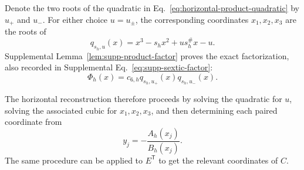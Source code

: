\documentclass[aps,prx,reprint,nofootinbib,twoside,superscriptaddress,longbibliography,floatfix]{revtex4-2}
\theoremstyle{definition}
\begin{document}
Denote the two roots of the quadratic in Eq.~\ref{eq:horizontal-product-quadratic} by $u_+$ and $u_-$. For either choice $u=u_\pm$, the corresponding coordinates $x_1,x_2,x_3$ are the roots of
\begin{equation}
q_{s_h,u}(x)=x^3-s_hx^2+us_h^\#x-u.
\label{eq:horizontal-coordinate-cubic}
\end{equation}
Supplemental Lemma~\ref{lem:supp-product-factor} proves the exact factorization,
also recorded in Supplemental Eq.~\eqref{eq:supp-sextic-factor}:
\begin{equation}
\Phi_h(x)=c_{6,h}q_{s_h,u_+}(x)q_{s_h,u_-}(x).
\end{equation}

The horizontal reconstruction therefore proceeds by solving the quadratic for $u$, solving the associated cubic for $x_1,x_2,x_3$, and then determining each paired coordinate from
\begin{equation}
y_j=-\frac{A_h(x_j)}{B_h(x_j)}.
\end{equation}
The same procedure can be applied to $E^{\mathsf T}$ to get the relevant coordinates of $C$. 
\end{document}
